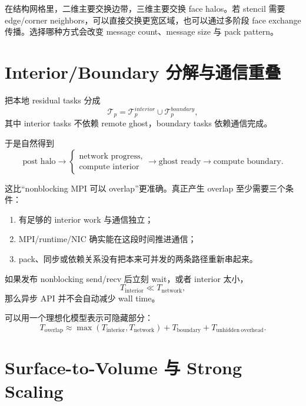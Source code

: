 在结构网格里，二维主要交换边带，三维主要交换 face halos。若 stencil 需要 edge/corner neighbors，可以直接交换更宽区域，也可以通过多阶段 face exchange 传播。选择哪种方式会改变 message count、message size 与 pack pattern。

\section{Interior/Boundary 分解与通信重叠}

把本地 residual tasks 分成
\begin{equation}
\mathcal T_p
=
\mathcal T_p^{interior}
\cup
\mathcal T_p^{boundary},
\end{equation}
其中 interior tasks 不依赖 remote ghost，boundary tasks 依赖通信完成。

于是自然得到
\begin{equation}
\boxed{
\text{post halo}
\rightarrow
\begin{cases}
\text{network progress},\\
\text{compute interior}
\end{cases}
\rightarrow
\text{ghost ready}
\rightarrow
\text{compute boundary}.
}
\label{eq:mpi-overlap-pattern}
\end{equation}

这比“nonblocking MPI 可以 overlap”更准确。真正产生 overlap 至少需要三个条件：

\begin{enumerate}
\item 有足够的 interior work 与通信独立；
\item MPI/runtime/NIC 确实能在这段时间推进通信；
\item pack、同步或依赖关系没有把本来可并发的两条路径重新串起来。
\end{enumerate}

如果发布 nonblocking send/recv 后立刻 wait，或者 interior 太小，
\begin{equation}
T_{\mathrm{interior}}
\ll
T_{\mathrm{network}},
\end{equation}
那么异步 API 并不会自动减少 wall time。

可以用一个理想化模型表示可隐藏部分：
\begin{equation}
T_{\mathrm{overlap}}
\approx
\max
\left(
T_{\mathrm{interior}},
T_{\mathrm{network}}
\right)
+
T_{\mathrm{boundary}}
+
T_{\mathrm{unhidden\ overhead}}.
\end{equation}

\section{Surface-to-Volume 与 Strong Scaling}

